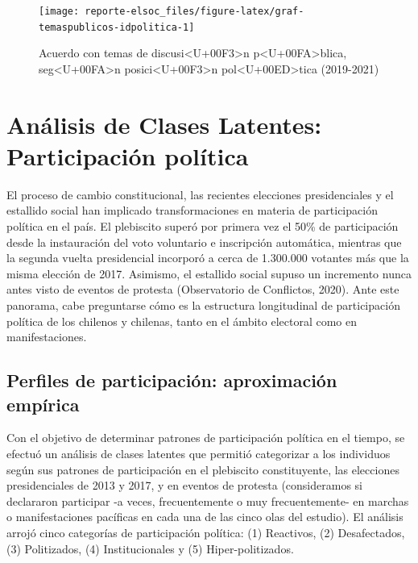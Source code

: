 \documentclass[
  12pt,
]{book}
\begin{document}
\begin{figure}

{\centering \texttt{[image: reporte-elsoc\_files/figure-latex/graf-temaspublicos-idpolitica-1]} 

}

\caption{Acuerdo con temas de discusi<U+00F3>n p<U+00FA>blica, seg<U+00FA>n posici<U+00F3>n pol<U+00ED>tica (2019-2021)}\label{fig:graf-temaspublicos-idpolitica}
\end{figure}

\hypertarget{anuxe1lisis-de-clases-latentes-participaciuxf3n-poluxedtica}{%
\section{Análisis de Clases Latentes: Participación política}\label{anuxe1lisis-de-clases-latentes-participaciuxf3n-poluxedtica}}

El proceso de cambio constitucional, las recientes elecciones presidenciales y el estallido social han implicado transformaciones en materia de participación política en el país. El plebiscito superó por primera vez el 50\% de participación desde la instauración del voto voluntario e inscripción automática, mientras que la segunda vuelta presidencial incorporó a cerca de 1.300.000 votantes más que la misma elección de 2017. Asimismo, el estallido social supuso un incremento nunca antes visto de eventos de protesta (Observatorio de Conflictos, 2020). Ante este panorama, cabe preguntarse cómo es la estructura longitudinal de participación política de los chilenos y chilenas, tanto en el ámbito electoral como en manifestaciones.

\hypertarget{perfiles-de-participaciuxf3n-aproximaciuxf3n-empuxedrica}{%
\subsection*{Perfiles de participación: aproximación empírica}\label{perfiles-de-participaciuxf3n-aproximaciuxf3n-empuxedrica}}

Con el objetivo de determinar patrones de participación política en el tiempo, se efectuó un análisis de clases latentes que permitió categorizar a los individuos según sus patrones de participación en el plebiscito constituyente, las elecciones presidenciales de 2013 y 2017, y en eventos de protesta (consideramos si declararon participar -a veces, frecuentemente o muy frecuentemente- en marchas o manifestaciones pacíficas en cada una de las cinco olas del estudio). El análisis arrojó cinco categorías de participación política: (1) Reactivos, (2) Desafectados, (3) Politizados, (4) Institucionales y (5) Hiper-politizados.
\end{document}
